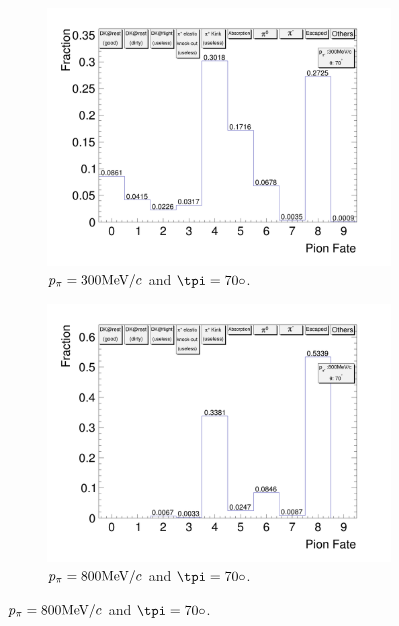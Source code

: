 \begin{figure}[t]
\begin{subfigure}{\dbfigwid\textwidth}
                    \label{subfig:pi-fate-200-70}
               \end{subfigure}
               \\
               \begin{subfigure}{\dbfigwid\textwidth}
                    \includegraphics[width=\textwidth]{figures/sel/pion_fate_300_70.png}
                    \caption{$p_{\pi}=300\textrm{MeV}/c$ and $\tpi=70\deg$.}
                    \label{subfig:pi-fate-300-70}
               \end{subfigure}
               \begin{subfigure}{\dbfigwid\textwidth}
                    \includegraphics[width=\textwidth]{figures/sel/pion_fate_800_70.png}
                    \caption{$p_{\pi}=800\textrm{MeV}/c$ and $\tpi=70\deg$.}
                    \label{subfig:pi-fate-800-70}
               \end{subfigure}
            \end{figure}

